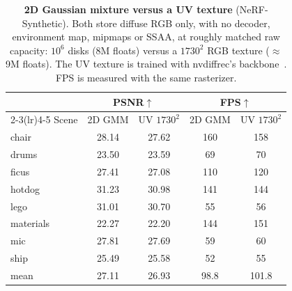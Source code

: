 \begin{table}[t]
\color{addcolor}
\centering
\footnotesize
\setlength{\tabcolsep}{4pt}
\caption{\textbf{2D Gaussian mixture versus a UV texture} (NeRF-Synthetic). Both store diffuse RGB
only, with no decoder, environment map, mipmaps or SSAA, at roughly matched raw capacity: $10^6$
disks (8M floats) versus a $1730^2$ RGB texture ($\approx$9M floats). The UV texture is trained with
nvdiffrec's backbone~\citep{nvdiffrec}. FPS is measured with the same rasterizer.}
\label{tab:uv}
\begin{tabular}{@{}lcccc@{}}
\toprule
& \multicolumn{2}{c}{PSNR$\uparrow$} & \multicolumn{2}{c}{FPS$\uparrow$} \\
\cmidrule(lr){2-3}\cmidrule(lr){4-5}
Scene & 2D GMM & UV $1730^2$ & 2D GMM & UV $1730^2$ \\
\midrule
chair     & 28.14 & 27.62 & 160 & 158 \\
drums     & 23.50 & 23.59 & 69 & 70 \\
ficus     & 27.41 & 27.08 & 110 & 120 \\
hotdog    & 31.23 & 30.98 & 141 & 144 \\
lego      & 31.01 & 30.70 & 55 & 56 \\
materials & 22.27 & 22.20 & 144 & 151 \\
mic       & 27.81 & 27.69 & 59 & 60 \\
ship      & 25.49 & 25.58 & 52 & 55 \\
\midrule
mean      & 27.11 & 26.93 & 98.8 & 101.8 \\
\bottomrule
\end{tabular}
\end{table}

